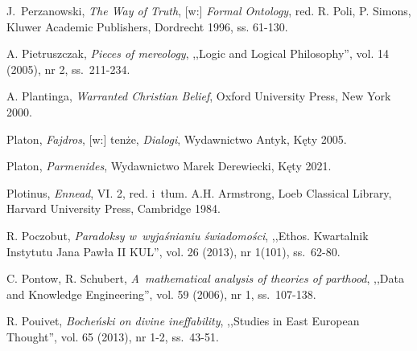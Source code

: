 \begin{thebibliography}{100}
J.~Perzanowski, \textit{The Way of Truth}, [w:] \textit{Formal Ontology}, red. R. Poli, P. Simons, Kluwer Academic Publishers, Dordrecht 1996, ss. 61-130.


A. Pietruszczak, \textit{Pieces of mereology}, ,,Logic and Logical Philosophy'', vol. 14 (2005), nr 2, ss.~211-234.


A. Plantinga, \textit{Warranted Christian Belief}, Oxford University Press, New York 2000.

Platon, \textit{Fajdros}, [w:] tenże, \textit{Dialogi}, Wydawnictwo Antyk, Kęty 2005.

Platon, \textit{Parmenides}, Wydawnictwo Marek Derewiecki, Kęty 2021.

Plotinus, \textit{Ennead}, VI. 2, red. i~tłum. A.H. Armstrong, Loeb Classical Library, Har\-vard University Press, Cambridge 1984.


R. Poczobut, \textit{Paradoksy w~wyjaśnianiu świadomości}, ,,Ethos. Kwartalnik Instytutu Jana Pawła II KUL'', vol. 26 (2013), nr 1(101), ss.~62-80.

C. Pontow, R. Schubert, \textit{A~mathematical analysis of theories of parthood}, ,,Data and Knowledge Engineering'', vol. 59 (2006), nr 1, ss.~107-138.


R. Pouivet, \textit{Bocheński on divine ineffability}, ,,Studies in East European Thought'', vol. 65 (2013), nr 1-2, ss.~43-51.


\end{thebibliography}
